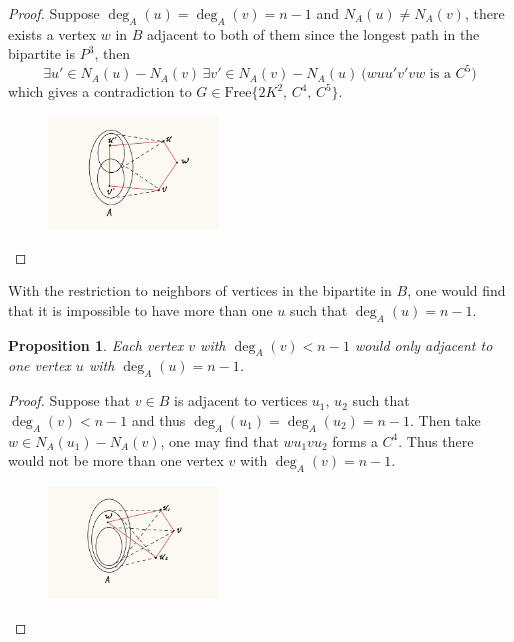 \documentclass{article}
\newtheorem{prop}{\bf Proposition}
\begin{document}
    \begin{proof}
        Suppose $\deg_A(u)=\deg_A(v)=n-1$ and $N_A(u)\neq N_A(v)$, there exists a vertex $w$ in $B$ adjacent to both of them since the longest path in the bipartite is $P^3$, then
        \begin{equation*}
            \exists u'\in N_A(u)-N_A(v)\,\exists v'\in N_A(v)-N_A(u)\ \big(wuu'v'vw \text{ is a } C^5\big)
        \end{equation*}
        which gives a contradiction to $G\in\text{Free}\{2K^2,\,C^4,\,C^5\}$.
        \begin{figure}[h!]%
        \centering
        \includegraphics[width=0.4\textwidth]{pic/g6.jpg}
    \end{figure}
    \end{proof}

    With the restriction to neighbors of vertices in the bipartite in $B$, one would find that it is impossible to have more than one $u$ such that $\deg_A(u)=n-1$.

    \begin{prop}
        Each vertex $v$ with $\deg_A(v)<n-1$ would only adjacent to one vertex $u$ with $\deg_A(u)=n-1$.
    \end{prop}

    \begin{proof}
        Suppose that $v\in B$ is adjacent to vertices $u_1,\,u_2$ such that $\deg_A(v)<n-1$ and thus $\deg_A(u_1)=\deg_A(u_2)=n-1$. Then take $w\in N_A(u_1)-N_A(v)$, one may find that $wu_1vu_2$ forms a $C^4$. Thus there would not be more than one vertex $v$ with $\deg_A(v)=n-1$.
        \begin{figure}[h!]%
        \centering
        \includegraphics[width=0.4\textwidth]{pic/g7.jpg}
    \end{figure}
    \end{proof}
\end{document}
